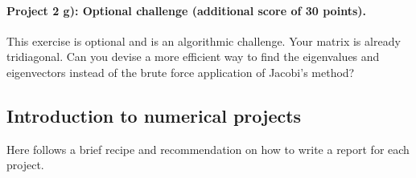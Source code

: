 \documentclass[%
oneside,                 %
final,                   %
10pt]{article}
\begin{document}
\paragraph{Project 2 g): Optional challenge (additional score of 30 points).}
This exercise is optional and is an algorithmic challenge. Your matrix is already tridiagonal. 
Can you devise a more efficient way to find the eigenvalues and eigenvectors instead of the brute force application of Jacobi's method? 



\subsection{Introduction to numerical projects}

Here follows a brief recipe and recommendation on how to write a report for each
project.
\end{document}
